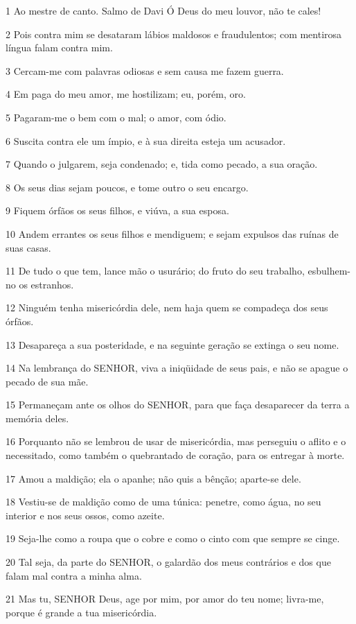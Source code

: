 \par 1 Ao mestre de canto. Salmo de Davi Ó Deus do meu louvor, não te cales!
\par 2 Pois contra mim se desataram lábios maldosos e fraudulentos; com mentirosa língua falam contra mim.
\par 3 Cercam-me com palavras odiosas e sem causa me fazem guerra.
\par 4 Em paga do meu amor, me hostilizam; eu, porém, oro.
\par 5 Pagaram-me o bem com o mal; o amor, com ódio.
\par 6 Suscita contra ele um ímpio, e à sua direita esteja um acusador.
\par 7 Quando o julgarem, seja condenado; e, tida como pecado, a sua oração.
\par 8 Os seus dias sejam poucos, e tome outro o seu encargo.
\par 9 Fiquem órfãos os seus filhos, e viúva, a sua esposa.
\par 10 Andem errantes os seus filhos e mendiguem; e sejam expulsos das ruínas de suas casas.
\par 11 De tudo o que tem, lance mão o usurário; do fruto do seu trabalho, esbulhem-no os estranhos.
\par 12 Ninguém tenha misericórdia dele, nem haja quem se compadeça dos seus órfãos.
\par 13 Desapareça a sua posteridade, e na seguinte geração se extinga o seu nome.
\par 14 Na lembrança do SENHOR, viva a iniqüidade de seus pais, e não se apague o pecado de sua mãe.
\par 15 Permaneçam ante os olhos do SENHOR, para que faça desaparecer da terra a memória deles.
\par 16 Porquanto não se lembrou de usar de misericórdia, mas perseguiu o aflito e o necessitado, como também o quebrantado de coração, para os entregar à morte.
\par 17 Amou a maldição; ela o apanhe; não quis a bênção; aparte-se dele.
\par 18 Vestiu-se de maldição como de uma túnica: penetre, como água, no seu interior e nos seus ossos, como azeite.
\par 19 Seja-lhe como a roupa que o cobre e como o cinto com que sempre se cinge.
\par 20 Tal seja, da parte do SENHOR, o galardão dos meus contrários e dos que falam mal contra a minha alma.
\par 21 Mas tu, SENHOR Deus, age por mim, por amor do teu nome; livra-me, porque é grande a tua misericórdia.
